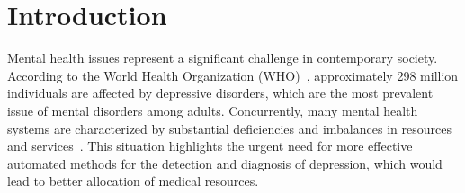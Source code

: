 \section{Introduction}

Mental health issues represent a significant challenge in contemporary society. According to the World Health Organization (WHO)~\cite{Freeman2022TheWM}, approximately 298 million individuals are affected by depressive disorders, which are the most prevalent issue of mental disorders among adults. Concurrently, many mental health systems are characterized by substantial deficiencies and imbalances in resources and services~\cite{Freeman2022TheWM}. This situation highlights the urgent need for more effective automated methods for the detection and diagnosis of depression, which would lead to better allocation of medical resources.

